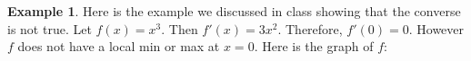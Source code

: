 \documentclass[reqno,psamsfonts]{amsart}
\theoremstyle{definition}
\newtheorem{exmp}[thm]{Example}
\theoremstyle{remark}
\numberwithin{equation}{section}
\begin{document}
\begin{exmp}
Here is the example we discussed in class showing that the converse is not true. Let $f(x) = x^3$. Then $f'(x) = 3x^2$. Therefore, $f'(0) = 0$. However $f$ does not have a local min or max at $x=0$. Here is the graph of $f$: 
\\
\\
\begin{center}
\end{center}
\end{exmp}

\newpage
\end{document}

